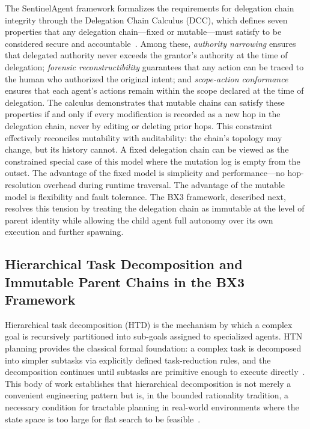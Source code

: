 The SentinelAgent framework formalizes the requirements for delegation chain integrity through the Delegation Chain Calculus (DCC), which defines seven properties that any delegation chain---fixed or mutable---must satisfy to be considered secure and accountable~\cite{sentinelagent2026}. Among these, \emph{authority narrowing} ensures that delegated authority never exceeds the grantor's authority at the time of delegation; \emph{forensic reconstructibility} guarantees that any action can be traced to the human who authorized the original intent; and \emph{scope-action conformance} ensures that each agent's actions remain within the scope declared at the time of delegation. The calculus demonstrates that mutable chains can satisfy these properties if and only if every modification is recorded as a new hop in the delegation chain, never by editing or deleting prior hops. This constraint effectively reconciles mutability with auditability: the chain's topology may change, but its history cannot. A fixed delegation chain can be viewed as the constrained special case of this model where the mutation log is empty from the outset. The advantage of the fixed model is simplicity and performance---no hop-resolution overhead during runtime traversal. The advantage of the mutable model is flexibility and fault tolerance. The BX3 framework, described next, resolves this tension by treating the delegation chain as immutable at the level of parent identity while allowing the child agent full autonomy over its own execution and further spawning.

\subsection{Hierarchical Task Decomposition and Immutable Parent Chains in the BX3 Framework}
\label{sec:bx3_substrate}

Hierarchical task decomposition (HTD) is the mechanism by which a complex goal is recursively partitioned into sub-goals assigned to specialized agents. HTN planning provides the classical formal foundation: a complex task is decomposed into simpler subtasks via explicitly defined task-reduction rules, and the decomposition continues until subtasks are primitive enough to execute directly~\cite{ghallab2004htn}. This body of work establishes that hierarchical decomposition is not merely a convenient engineering pattern but is, in the bounded rationality tradition, a necessary condition for tractable planning in real-world environments where the state space is too large for flat search to be feasible~\cite{erpl,simon}.

